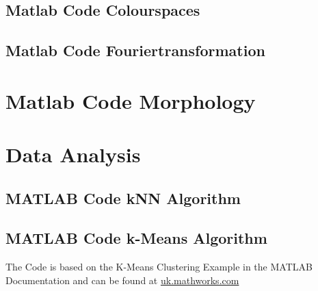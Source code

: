\appendix
\subsection{Matlab  Code Colourspaces}


\subsection{Matlab Code Fouriertransformation}

\section{Matlab Code Morphology}

\section{Data Analysis}

\subsection{MATLAB Code kNN Algorithm}
\label{apdx:kNN}


\subsection{MATLAB Code k-Means Algorithm}
\label{apdx:kmeans}
The Code is based on the K-Means Clustering Example in the MATLAB Documentation and can be found at \href{https://uk.mathworks.com/help/images/examples/color-based-segmentation-using-k-means-clustering.html}{uk.mathworks.com}
